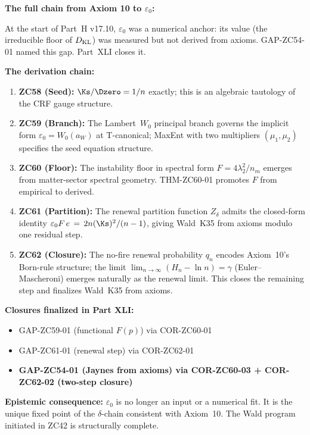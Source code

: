 \documentclass[12pt, a4paper]{article}
\begin{document}
\begin{keybox}[title={Part XLI Synthesis --- $\varepsilon_0$ from Axioms}]
\textbf{The full chain from Axiom 10 to $\varepsilon_0$:}

\smallskip
At the start of Part~H v17.10, $\varepsilon_0$ was a numerical anchor:
its value (the irreducible floor of $D_{\rm KL}$) was measured but
not derived from axioms. GAP-ZC54-01 named this gap. Part~XLI closes it.

\smallskip
\textbf{The derivation chain:}
\begin{enumerate}[leftmargin=1.5em]
\item \textbf{ZC58 (Seed):} $\Ks/\Dzero=1/n$ exactly; this is an
  algebraic tautology of the CRF gauge structure.
\item \textbf{ZC59 (Branch):} The Lambert~$W_{0}$ principal branch
  governs the implicit form $\varepsilon_0 = W_{0}(a_W)$ at T-canonical;
  MaxEnt with two multipliers $(\mu_1,\mu_2)$ specifies the seed
  equation structure.
\item \textbf{ZC60 (Floor):} The instability floor in spectral form
  $F=4\lambda_{2}^{2}/n_{m}$ emerges from matter-sector spectral
  geometry. THM-ZC60-01 promotes $F$ from empirical to derived.
\item \textbf{ZC61 (Partition):} The renewal partition function
  $Z_{\delta}$ admits the closed-form identity
  $\varepsilon_0 F\,e\,=\,2n(\Ks)^{2}/(n-1)$, giving Wald~K35
  from axioms modulo one residual step.
\item \textbf{ZC62 (Closure):} The no-fire renewal probability
  $q_{n}$ encodes Axiom~10's Born-rule structure; the limit
  $\lim_{n\to\infty}(H_{n}-\ln n)=\gamma$ (Euler--Mascheroni)
  emerges naturally as the renewal limit. This closes the
  remaining step and finalizes Wald~K35 from axioms.
\end{enumerate}

\smallskip
\textbf{Closures finalized in Part XLI:}
\begin{itemize}[leftmargin=1.5em]
\item GAP-ZC59-01 (functional $F(p)$) \closedcheck{} via COR-ZC60-01
\item GAP-ZC61-01 (renewal step) \closedcheck{} via COR-ZC62-01
\item \textbf{GAP-ZC54-01 (Jaynes from axioms) \closedcheck{} via
  COR-ZC60-03 + COR-ZC62-02 (two-step closure)}
\end{itemize}

\smallskip
\textbf{Epistemic consequence:} $\varepsilon_0$ is no longer an
input or a numerical fit. It is the unique fixed point of the
$\delta$-chain consistent with Axiom~10. The Wald program initiated
in ZC42 is structurally complete.
\end{keybox}
\end{document}
